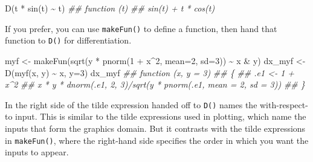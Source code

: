 \documentclass[
  letterpaper,
  DIV=11,
  numbers=noendperiod,
  oneside]{scrreprt}
\newenvironment{Shaded}{\begin{snugshade}}{\end{snugshade}}
\newcommand{\AttributeTok}[1]{\textcolor[rgb]{0.40,0.46,0.14}{#1}}
\newcommand{\DecValTok}[1]{\textcolor[rgb]{0.68,0.00,0.00}{#1}}
\newcommand{\DocumentationTok}[1]{\textcolor[rgb]{0.37,0.37,0.37}{\textit{#1}}}
\newcommand{\FunctionTok}[1]{\textcolor[rgb]{0.28,0.35,0.67}{#1}}
\newcommand{\NormalTok}[1]{\textcolor[rgb]{0.00,0.46,0.62}{#1}}
\newcommand{\OtherTok}[1]{\textcolor[rgb]{0.00,0.46,0.62}{#1}}
\newcommand{\SpecialCharTok}[1]{\textcolor[rgb]{0.37,0.37,0.37}{#1}}
\begin{document}
\begin{Shaded}
\begin{Highlighting}[]
\FunctionTok{D}\NormalTok{(t }\SpecialCharTok{*} \FunctionTok{sin}\NormalTok{(t) }\SpecialCharTok{\textasciitilde{}}\NormalTok{ t)}
\DocumentationTok{\#\# function (t) }
\DocumentationTok{\#\# sin(t) + t * cos(t)}
\end{Highlighting}
\end{Shaded}

If you prefer, you can use \texttt{makeFun()} to define a function, then
hand that function to \texttt{D()} for differentiation.

\begin{Shaded}
\begin{Highlighting}[]
\NormalTok{myf }\OtherTok{\textless{}{-}} \FunctionTok{makeFun}\NormalTok{(}\FunctionTok{sqrt}\NormalTok{(y }\SpecialCharTok{*} \FunctionTok{pnorm}\NormalTok{(}\DecValTok{1} \SpecialCharTok{+}\NormalTok{ x}\SpecialCharTok{\^{}}\DecValTok{2}\NormalTok{, }\AttributeTok{mean=}\DecValTok{2}\NormalTok{, }\AttributeTok{sd=}\DecValTok{3}\NormalTok{)) }\SpecialCharTok{\textasciitilde{}}\NormalTok{ x }\SpecialCharTok{\&}\NormalTok{ y)}
\NormalTok{dx\_myf }\OtherTok{\textless{}{-}} \FunctionTok{D}\NormalTok{(}\FunctionTok{myf}\NormalTok{(x, y) }\SpecialCharTok{\textasciitilde{}}\NormalTok{ x, }\AttributeTok{y=}\DecValTok{3}\NormalTok{)}
\NormalTok{dx\_myf}
\DocumentationTok{\#\# function (x, y = 3) }
\DocumentationTok{\#\# \{}
\DocumentationTok{\#\#     .e1 \textless{}{-} 1 + x\^{}2}
\DocumentationTok{\#\#     x * y * dnorm(.e1, 2, 3)/sqrt(y * pnorm(.e1, mean = 2, sd = 3))}
\DocumentationTok{\#\# \}}
\end{Highlighting}
\end{Shaded}

In the right side of the tilde expression handed off to \texttt{D()}
names the with-respect-to input. This is similar to the tilde
expressions used in plotting, which name the inputs that form the
graphics domain. But it contrasts with the tilde expressions in
\texttt{makeFun()}, where the right-hand side specifies the order in
which you want the inputs to appear.
\end{document}
